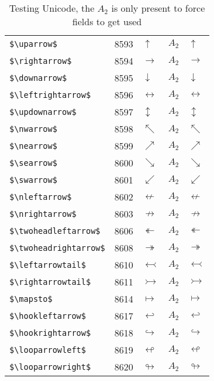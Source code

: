 \documentclass{article}
\begin{document}
\begin{table}
\begin{center}
\begin{tabular}{llll}
 \verb#$\uparrow$#           & 8593 & $\uparrow$           & $A_2\quad \uparrow$\\
 \verb#$\rightarrow$#        & 8594 & $\rightarrow$        & $A_2\quad \rightarrow$\\
 \verb#$\downarrow$#         & 8595 & $\downarrow$         & $A_2\quad \downarrow$\\
 \verb#$\leftrightarrow$#    & 8596 & $\leftrightarrow$    & $A_2\quad \leftrightarrow$\\
 \verb#$\updownarrow$#       & 8597 & $\updownarrow$       & $A_2\quad \updownarrow$\\
 \verb#$\nwarrow$#           & 8598 & $\nwarrow$           & $A_2\quad \nwarrow$\\
 \verb#$\nearrow$#           & 8599 & $\nearrow$           & $A_2\quad \nearrow$\\
 \verb#$\searrow$#           & 8600 & $\searrow$           & $A_2\quad \searrow$\\
 \verb#$\swarrow$#           & 8601 & $\swarrow$           & $A_2\quad \swarrow$\\
 \verb#$\nleftarrow$#        & 8602 & $\nleftarrow$        & $A_2\quad \nleftarrow$\\
 \verb#$\nrightarrow$#       & 8603 & $\nrightarrow$       & $A_2\quad \nrightarrow$\\
 \verb#$\twoheadleftarrow$#  & 8606 & $\twoheadleftarrow$  & $A_2\quad \twoheadleftarrow$\\
 \verb#$\twoheadrightarrow$# & 8608 & $\twoheadrightarrow$ & $A_2\quad \twoheadrightarrow$\\
 \verb#$\leftarrowtail$#     & 8610 & $\leftarrowtail$     & $A_2\quad \leftarrowtail$\\
 \verb#$\rightarrowtail$#    & 8611 & $\rightarrowtail$    & $A_2\quad \rightarrowtail$\\
 \verb#$\mapsto$#            & 8614 & $\mapsto$            & $A_2\quad \mapsto$\\
 \verb#$\hookleftarrow$#     & 8617 & $\hookleftarrow$     & $A_2\quad \hookleftarrow$\\
 \verb#$\hookrightarrow$#    & 8618 & $\hookrightarrow$    & $A_2\quad \hookrightarrow$\\
 \verb#$\looparrowleft$#     & 8619 & $\looparrowleft$     & $A_2\quad \looparrowleft$\\
 \verb#$\looparrowright$#    & 8620 & $\looparrowright$    & $A_2\quad \looparrowright$\\
\end{tabular}
\end{center}
\caption{Testing Unicode, the $A_2$ is only present to force fields to get used}
\end{table}
\end{document}
